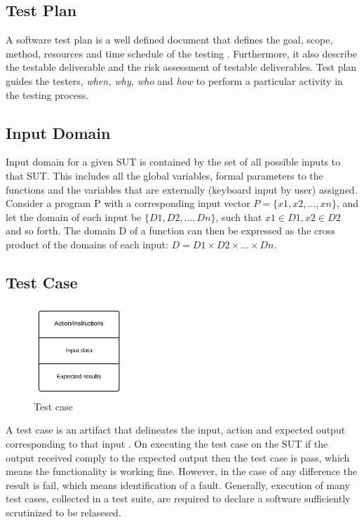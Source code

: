 \subsection{Test Plan}
A software test plan is a well defined document that defines the goal, scope, method, resources and time schedule of the testing \cite{futrell2001quality}. Furthermore, it also describe the testable deliverable and the risk assessment of testable deliverables. Test plan guides the testers, {\it {when, why, who}} and {\it {how}} to perform a particular activity in the testing process. 

\subsection{Input Domain} 
Input domain for a given SUT is contained by the set of all possible inputs to that SUT. This includes all the global variables, formal parameters to the functions and the variables that are externally (keyboard input by user) assigned. Consider a program P with a corresponding input vector $ P =\{x1, x2, . . . , xn\}$, and let the domain of each input be $\{D1, D2, . . . , Dn\}$, such that $x1 \in D1,x2 \in D2$ and so forth. The domain D of a function can then be expressed as the cross product of the domains of each input: $D = D1 \times D2 \times . . . \times Dn$.

\subsection{Test Case}
\begin{figure}
  \vspace{-20pt}
  \begin{center}
    \includegraphics[width=0.30\textwidth]{chapter2/testCase.png}
  \end{center}
  \vspace{-20pt}
  \caption{Test case}
  \label{fig:testCase}
  \vspace{-10pt}
\end{figure}
A test case is an artifact that delineates the input, action and expected output corresponding to that input \cite{ahmed2010software}. On executing the test case on the SUT if the output received comply to the expected output then the test case is pass, which means the functionality is working fine. However, in the case of any difference the result is fail, which means identification of a fault. Generally, execution of many test cases, collected in a test suite, are required to declare a software sufficiently scrutinized to be relasesed.

